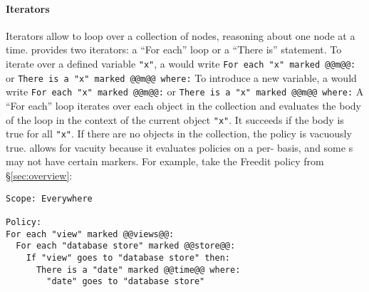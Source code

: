 \paragraph{Iterators}
Iterators allow \ces{} to loop over a collection of nodes, reasoning about one node at a time.
%
\syslang{} provides two iterators: a ``For each'' loop or a ``There is'' statement.
%
To iterate over a defined variable \lstinline[language=CNL]|"x"|, 
a \ce{} would write \lstinline[language=CNL]|For each "x" marked @@m@@:| or \lstinline[language=CNL]|There is a "x" marked @@m@@ where:|
%
To introduce a new variable,
a \ce{} would write \lstinline[language=CNL]|For each "x" marked @@m@@:| or \lstinline[language=CNL]|There is a "x" marked @@m@@ where:|
%
A ``For each'' loop iterates over each object in the collection and evaluates the body of the loop 
in the context of the current object \lstinline[language=CNL]|"x"|.
%
It succeeds if the body is true for all \lstinline[language=CNL]|"x"|.
%
If there are no objects in the collection, the policy is vacuously true.
%
\syslang{} allows for vacuity because it evaluates policies on a per-\controller{} basis,
and some \controller{}s may not have certain markers.
%
For example, take the Freedit policy from \S\ref{sec:overview}:
\begin{lstlisting}[language=CNL]
Scope: Everywhere

Policy:
For each "view" marked @@views@@:
  For each "database store" marked @@store@@:
    If "view" goes to "database store" then:
      There is a "date" marked @@time@@ where:
        "date" goes to "database store"
\end{lstlisting}

